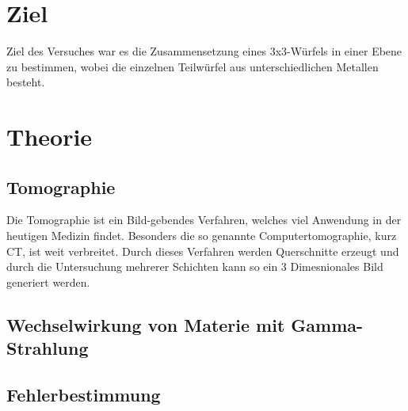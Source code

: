 \section{Ziel}
Ziel des Versuches war es die Zusammensetzung eines 3x3-Würfels in einer Ebene zu bestimmen, wobei die einzelnen Teilwürfel aus unterschiedlichen Metallen besteht. 

\section{Theorie}
\subsection{Tomographie}
Die Tomographie ist ein Bild-gebendes Verfahren, welches viel Anwendung in der heutigen Medizin findet. Besonders die so genannte Computertomographie, kurz CT, ist weit 
verbreitet.
Durch dieses Verfahren werden Querschnitte erzeugt und durch die Untersuchung mehrerer Schichten kann so ein 3 Dimesnionales Bild generiert werden.

\noindent


\subsection{Wechselwirkung von Materie mit Gamma-Strahlung}

\subsection{Fehlerbestimmung}